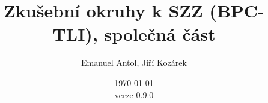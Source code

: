 \documentclass[11pt,a4paper]{article}
\title{Zkušební okruhy k SZZ (BPC-TLI), společná část}
\date{\today\\verze 0.9.0}
\author{Emanuel Antol, Jiří Kozárek}
\begin{document}
\maketitle
\pagebreak
\tableofcontents
\pagebreak
\graphicspath{ {./pictures/} }













\end{document}
